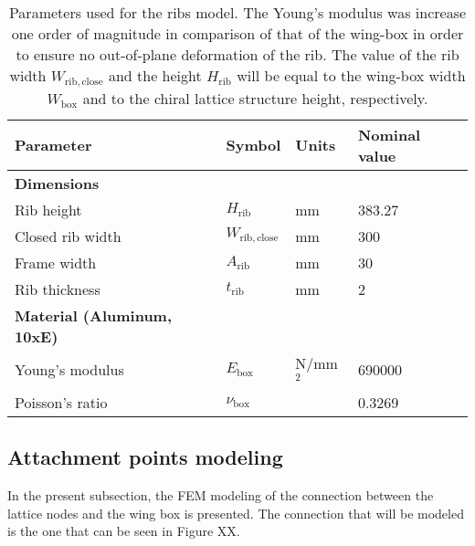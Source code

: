 \begin{table}[!htpb]
\centering
\begin{tabular}{|l|lll|}
\hline
\textbf{Parameter} & \multicolumn{1}{l|}{\textbf{Symbol}} & \multicolumn{1}{l|}{\textbf{Units}} & \textbf{Nominal value} \\ \hline \hline
{\textbf{Dimensions}} &  &  &  \\ \hline
Rib height & \multicolumn{1}{l|}{$H_{\mathrm{rib}}$} & \multicolumn{1}{l|}{mm} & 383.27 \\ \hline
Closed rib width & \multicolumn{1}{l|}{$W_{\mathrm{rib,close}}$} & \multicolumn{1}{l|}{mm} & 300 \\ \hline
Frame width & \multicolumn{1}{l|}{$A_{\mathrm{rib}}$} & \multicolumn{1}{l|}{mm} & 30 \\ \hline
Rib thickness & \multicolumn{1}{l|}{$t_{\mathrm{rib}}$} & \multicolumn{1}{l|}{mm} & 2 \\ \hline \hline
{\textbf{Material (Aluminum, 10xE)}} &  &  &  \\ \hline
Young's modulus & \multicolumn{1}{l|}{$E_{\mathrm{box}}$} & \multicolumn{1}{l|}{N/mm$^2$} & 690000 \\ \hline
Poisson's ratio & \multicolumn{1}{l|}{$\nu_{\mathrm{box}}$} & \multicolumn{1}{l|}{} & 0.3269 \\ \hline
\end{tabular}
\caption[Parameters used for the ribs model]{Parameters used for the ribs model. The Young's modulus was increase one order of magnitude in comparison of that of the wing-box in order to ensure no out-of-plane deformation of the rib. The value of the rib width $W_{\mathrm{rib,close}}$ and the height $H_{\mathrm{rib}}$ will be equal to the wing-box width $W_{\mathrm{box}}$ and to the chiral lattice structure height, respectively.}
\label{tab:parameters_rib}
\end{table}

\subsection{Attachment points modeling} \label{subsec:connections_computationalModel}

%
%
% 
%
In the present subsection, the FEM modeling of the connection between the lattice nodes and the wing box is presented. The connection that will be modeled is the one that can be seen in Figure XX.

